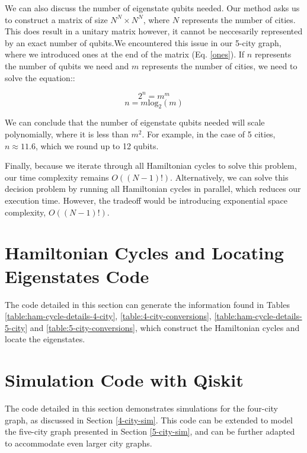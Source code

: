 \documentclass[msc,oneside]{ubcthesis}
\begin{document}
We can also discuss the number of eigenstate qubits needed. Our method asks us to construct a matrix of size $N^N \times N^N$, where $N$ represents the number of cities. This does result in a unitary matrix however, it cannot be neccesarily represented by an exact number of qubits.We encountered this issue in our 5-city graph, where we introduced ones at the end of the matrix (Eq. \ref{ones}). If $n$ represents the number of qubits we need and $m$ represents the number of cities, we need to solve the equation::

$$2^n = m^m$$
$$n = m\mathrm{log}_2(m)$$

We can conclude that the number of eigenstate qubits needed will scale polynomially, where it is less than $m^2$. For example, in the case of 5 cities, $n \approx 11.6$, which we round up to 12 qubits.

Finally, because we iterate through all Hamiltonian cycles to solve this problem, our time complexity remains $O((N-1)!)$. Alternatively, we can solve this decision problem by running all Hamiltonian cycles in parallel, which reduces our execution time. However, the tradeoff would be introducing exponential space complexity, $O((N-1)!)$.
	
	

	

	\appendix
	\chapter{Hamiltonian Cycles and Locating Eigenstates Code}
	
	The code detailed in this section can generate the information found in Tables \ref{table:ham-cycle-details-4-city}, \ref{table:4-city-conversions},  \ref{table:ham-cycle-details-5-city} and \ref{table:5-city-conversions}, which construct the Hamiltonian cycles and locate the eigenstates. 
	
	
	\chapter{Simulation Code with Qiskit}
	
	The code detailed in this section demonstrates simulations for the four-city graph, as discussed in Section \ref{4-city-sim}. This code can be extended to model the five-city graph presented in Section \ref{5-city-sim}, and can be further adapted to accommodate even larger city graphs.
	
	
	
	\backmatter
	
	
	
\end{document}
